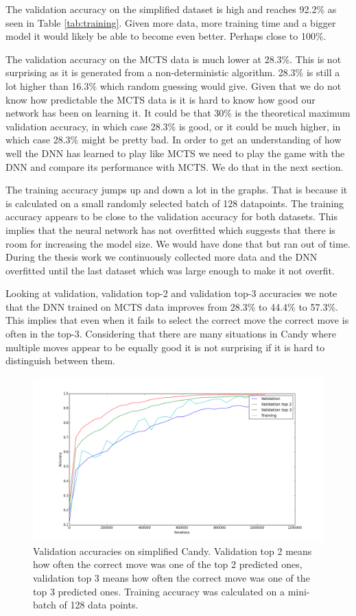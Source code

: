 \documentclass{kththesis}
\begin{document}
The validation accuracy on the simplified dataset is high and reaches 92.2\% as seen in Table \ref{tab:training}. Given more data, more training time and a bigger model  it would likely be able to become even better. Perhaps close to 100\%.

The validation accuracy on the MCTS data is much lower at 28.3\%. This is not surprising as  it is generated from a non-deterministic algorithm. 28.3\% is still a lot higher than 16.3\% which random guessing would give. Given that we do not know how predictable the MCTS data is it is hard to know how good our network has been on learning it. It could be that 30\% is the theoretical maximum validation accuracy, in which case 28.3\% is good, or it could be much higher, in which case 28.3\% might be pretty bad. In order to get an understanding of how well the DNN has learned to play like MCTS we need to play the game with the DNN and compare its performance with MCTS. We do that in the next section.

The training accuracy jumps up and down a lot in the  graphs. That is because  it is calculated on a small randomly selected batch of 128 datapoints. The training accuracy appears to be close to the validation accuracy for both datasets. This  implies that the neural network has not overfitted which suggests that there is room for increasing the model size. We would have done that but ran out of time. During the thesis work we continuously collected  more data and the DNN overfitted until the last dataset which was  large enough to make it not overfit. 

Looking at validation, validation top-2 and validation top-3 accuracies we note that the DNN trained on MCTS data improves from 28.3\% to 44.4\% to 57.3\%. This implies that even when it fails to select the correct move the correct move is often in the top-3. Considering that there are many situations in Candy where multiple moves appear to be equally good it is not surprising if it is hard to distinguish between them. 

\begin{figure}[!htb]
\centering
\includegraphics[width=\textwidth]{images/candy_small_validation.png}
\caption{Validation accuracies on simplified Candy. Validation top 2 means how often the correct move was one of the top 2 predicted ones, validation top 3 means how often the correct move was one of the top 3 predicted ones. Training accuracy was calculated on a mini-batch of 128 data points.}
\label{fig:candy_small_validation_accuracy}
\end{figure}
\end{document}
